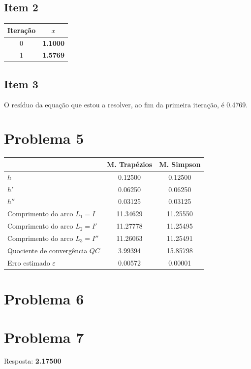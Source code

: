 \subsection{Item 2}

\begin{center}
    \begin{tabular}{c | c}
        Iteração & $x$ \\ \hline
        0 & \textbf{1.1000} \\
        1 & \textbf{1.5769}
    \end{tabular}
\end{center}
\subsection{Item 3}
O resíduo da equação que estou a resolver, ao fim da primeira iteração, é 0.4769.
{
\renewcommand{\thesubsection}{\thesection\alph{subsection}}
\section{Problema 5}


\begin{center}
    \begin{tabular}{l | c c}
        & M. Trapézios & M. Simpson \\ \hline
        $h$ & 0.12500  &       0.12500 \\
        $h'$ & 0.06250  &       0.06250 \\
        $h''$ & 0.03125  &       0.03125 \\
        Comprimento do arco $L_1=I$ & 11.34629 &       11.25550 \\
        Comprimento do arco $L_2=I'$ & 11.27778 &       11.25495 \\
        Comprimento do arco $L_3=I''$ & 11.26063 &       11.25491 \\
        Quociente de convergência $QC$ & 3.99394  &       15.85798 \\
        Erro estimado $\varepsilon$ & 0.00572  &       0.00001
    \end{tabular}
\end{center}
\section{Problema 6}
\section{Problema 7}

Resposta: \textbf{2.17500}
}